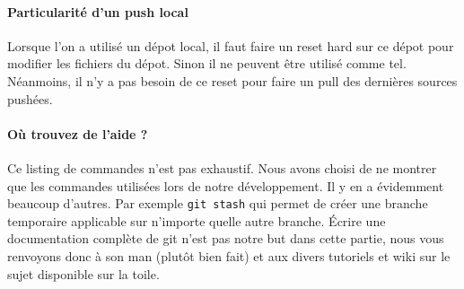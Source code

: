 \paragraph{Particularité d'un push local}
Lorsque l'on a utilisé un dépot local, il faut faire un reset hard sur ce dépot pour modifier les fichiers du dépot. Sinon il ne peuvent être utilisé comme tel. Néanmoins, il n'y a pas besoin de ce reset pour faire un pull des dernières sources pushées.

\paragraph{Où trouvez de l'aide ?}
Ce listing de commandes n'est pas exhaustif. Nous avons choisi de ne montrer que les commandes utilisées lors de notre développement. Il y en a évidemment beaucoup d'autres. Par exemple \verb|git stash| qui permet de créer une branche temporaire applicable sur n'importe quelle autre branche. Écrire une documentation complète de git n'est pas notre but dans cette partie, nous vous renvoyons donc à son man (plutôt bien fait) et aux divers tutoriels et wiki sur le sujet disponible sur la toile.

